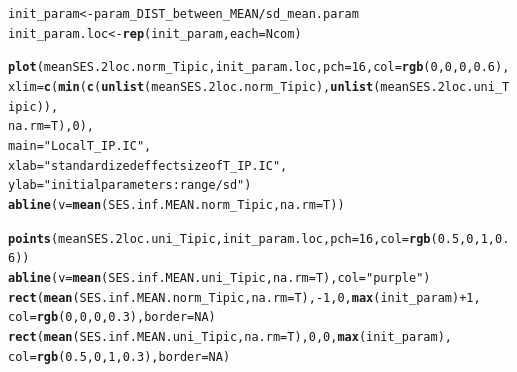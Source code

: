 \documentclass[12pt]{article}\usepackage[]{graphicx}\usepackage[]{color}
\makeatletter
\newcommand{\hlnum}[1]{\textcolor[rgb]{0.686,0.059,0.569}{#1}}%
\newcommand{\hlstr}[1]{\textcolor[rgb]{0.192,0.494,0.8}{#1}}%
\newcommand{\hlopt}[1]{\textcolor[rgb]{0,0,0}{#1}}%
\newcommand{\hlstd}[1]{\textcolor[rgb]{0.345,0.345,0.345}{#1}}%
\newcommand{\hlkwb}[1]{\textcolor[rgb]{0.69,0.353,0.396}{#1}}%
\newcommand{\hlkwc}[1]{\textcolor[rgb]{0.333,0.667,0.333}{#1}}%
\newcommand{\hlkwd}[1]{\textcolor[rgb]{0.737,0.353,0.396}{\textbf{#1}}}%
\newenvironment{kframe}{%
 \def\at@end@of@kframe{}%
 \ifinner\ifhmode%
  \def\at@end@of@kframe{\end{minipage}}%
  \begin{minipage}{\columnwidth}%
 \fi\fi%
 \def\FrameCommand##1{\hskip\@totalleftmargin \hskip-\fboxsep
 \colorbox{shadecolor}{##1}\hskip-\fboxsep
     \hskip-\linewidth \hskip-\@totalleftmargin \hskip\columnwidth}%
 \MakeFramed {\advance\hsize-\width
   \@totalleftmargin\z@ \linewidth\hsize
   \@setminipage}}%
 {\par\unskip\endMakeFramed%
 \at@end@of@kframe}
\newenvironment{knitrout}{}{} %
\makeatother
\begin{document}
  
\begin{knitrout}\small
{}\color{fgcolor}\begin{kframe}
\begin{alltt}
\hlstd{init_param} \hlkwb{<-} \hlstd{param_DIST_between_MEAN} \hlopt{/} \hlstd{sd_mean.param}
\hlstd{init_param.loc} \hlkwb{<-} \hlkwd{rep}\hlstd{(init_param,} \hlkwc{each} \hlstd{= Ncom)}

\hlkwd{plot}\hlstd{(meanSES.2loc.norm_Tipic, init_param.loc,} \hlkwc{pch} \hlstd{=} \hlnum{16}\hlstd{,} \hlkwc{col} \hlstd{=} \hlkwd{rgb}\hlstd{(}\hlnum{0}\hlstd{,} \hlnum{0}\hlstd{,} \hlnum{0}\hlstd{,} \hlnum{0.6}\hlstd{),}
     \hlkwc{xlim} \hlstd{=} \hlkwd{c}\hlstd{(}\hlkwd{min}\hlstd{(}\hlkwd{c}\hlstd{(}\hlkwd{unlist}\hlstd{(meanSES.2loc.norm_Tipic),} \hlkwd{unlist}\hlstd{(meanSES.2loc.uni_Tipic)),}
     \hlkwc{na.rm} \hlstd{= T),} \hlnum{0}\hlstd{),}
     \hlkwc{main} \hlstd{=} \hlstr{"Local T_IP.IC"}\hlstd{,}
     \hlkwc{xlab} \hlstd{=} \hlstr{"standardized effect size of T_IP.IC"}\hlstd{,}
     \hlkwc{ylab} \hlstd{=} \hlstr{"initial parameters: range/sd"}\hlstd{)}
\hlkwd{abline}\hlstd{(}\hlkwc{v} \hlstd{=} \hlkwd{mean}\hlstd{(SES.inf.MEAN.norm_Tipic,} \hlkwc{na.rm} \hlstd{= T))}

\hlkwd{points}\hlstd{(meanSES.2loc.uni_Tipic, init_param.loc,} \hlkwc{pch} \hlstd{=} \hlnum{16}\hlstd{,} \hlkwc{col} \hlstd{=} \hlkwd{rgb}\hlstd{(}\hlnum{0.5}\hlstd{,} \hlnum{0}\hlstd{,} \hlnum{1}\hlstd{,} \hlnum{0.6}\hlstd{))}
\hlkwd{abline}\hlstd{(}\hlkwc{v} \hlstd{=} \hlkwd{mean}\hlstd{(SES.inf.MEAN.uni_Tipic,} \hlkwc{na.rm} \hlstd{= T),} \hlkwc{col} \hlstd{=} \hlstr{"purple"}\hlstd{)}
\hlkwd{rect}\hlstd{(}\hlkwd{mean}\hlstd{(SES.inf.MEAN.norm_Tipic,} \hlkwc{na.rm} \hlstd{= T),} \hlopt{-}\hlnum{1}\hlstd{,} \hlnum{0}\hlstd{,} \hlkwd{max}\hlstd{(init_param)} \hlopt{+} \hlnum{1}\hlstd{,}
     \hlkwc{col} \hlstd{=} \hlkwd{rgb}\hlstd{(}\hlnum{0}\hlstd{,} \hlnum{0}\hlstd{,} \hlnum{0}\hlstd{,} \hlnum{0.3}\hlstd{),} \hlkwc{border} \hlstd{=} \hlnum{NA}\hlstd{)}
\hlkwd{rect}\hlstd{(}\hlkwd{mean}\hlstd{(SES.inf.MEAN.uni_Tipic,} \hlkwc{na.rm} \hlstd{= T),} \hlnum{0}\hlstd{,} \hlnum{0}\hlstd{,} \hlkwd{max}\hlstd{(init_param),}
     \hlkwc{col} \hlstd{=} \hlkwd{rgb}\hlstd{(}\hlnum{0.5}\hlstd{,} \hlnum{0}\hlstd{,} \hlnum{1}\hlstd{,} \hlnum{0.3}\hlstd{),} \hlkwc{border} \hlstd{=} \hlnum{NA}\hlstd{)}
\end{alltt}
\end{kframe}\begin{figure}


\end{figure}
\end{knitrout}
\end{document}
